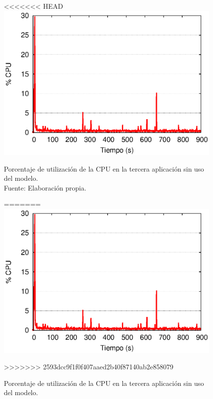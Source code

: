 \begin{figure}[!ht]
<<<<<<< HEAD
	\centering
	\captionsetup{justification=centering}
    \includegraphics[scale=0.65]{images/exp/app3/sm/fisical/consumeCPU.eps}
    \caption[Porcentaje de utilización de la CPU en la tercera aplicación sin uso del modelo.]{Porcentaje de utilización de la CPU en la tercera aplicación sin uso del modelo.\\Fuente: Elaboración propia.}
=======
\centering
    \includegraphics[scale=0.75]{images/exp/app3/sm/fisical/consumeCPU.eps}
    \caption{Porcentaje de utilizaci\'on de la CPU en la tercera aplicaci\'on sin uso del modelo.}
>>>>>>> 2593dcc9f1f0f407aaed2b40f87140ab2e858079
    \label{fig:app3-consumeCPU-sm}
\end{figure}


